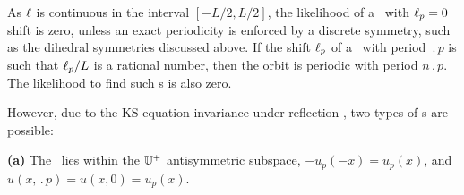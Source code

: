 
As $\ell$ is continuous in the interval $[-L/2, L/2]$,
the likelihood of a \rpo\ with $\ell_p = 0$ shift is zero,
unless an exact periodicity is enforced by a discrete symmetry,
such as the dihedral symmetries discussed above.
If the shift $\ell_p$ of a \rpo\ with period $\period{p}$ is such
that $\ell_p /L$ is a rational number, then the orbit is
periodic with period $n\period{p}$.  The likelihood to find such \po s is
also zero.

However, due to the KS equation invariance under reflection ,
two types of \po s are possible:

{\bf (a)} The \po\ lies within the  $\mathbb{U}^+$ antisymmetric subspace,
$-u_p(-x) = u_p(x)$, and $u(x,\period{p}) = u(x,0) = u_p(x)$.

